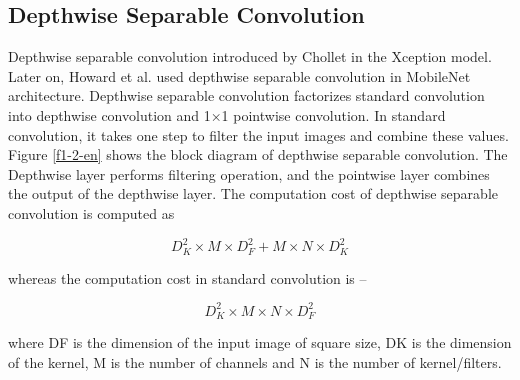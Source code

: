 
\subsection{Depthwise Separable Convolution}
Depthwise separable convolution introduced by Chollet  in the Xception model. Later on, Howard et al. used depthwise separable convolution in MobileNet architecture. Depthwise separable convolution factorizes standard convolution into depthwise convolution and 1×1 pointwise convolution. In standard convolution, it takes one step to filter the input images and combine these values. Figure \ref{f1-2-en} shows the block diagram of depthwise separable convolution. The Depthwise layer performs filtering operation, and the pointwise layer combines the output of the depthwise layer. The computation cost of depthwise separable convolution is computed as 

\begin{equation*} D_{K}^{2}\times M\times D_{F}^{2}+M\times N\times D_{K}^{2}\tag{1}\end{equation*}

whereas the computation cost in standard convolution is –

\begin{equation*} D_{K}^{2}\times M\times N \times D_{F}^{2}\tag{2}\end{equation*}

where DF is the dimension of the input image of square size, DK is the dimension of the kernel, M is the number of channels and N is the number of kernel/filters.


